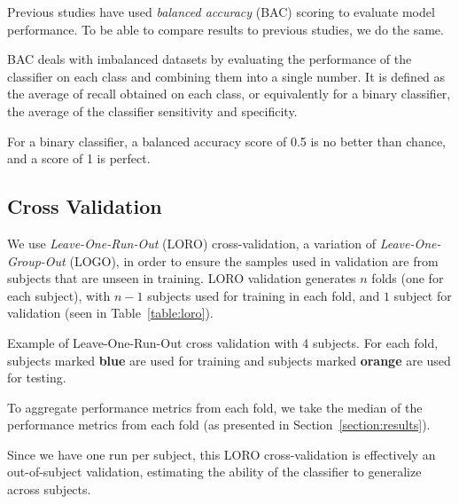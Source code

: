         Previous studies have used \emph{balanced accuracy} (BAC) scoring to evaluate model performance. To be able to compare results to previous studies, we do the same. 

        BAC deals with imbalanced datasets by evaluating the performance of the classifier on each class and combining them into a single number. It is defined as the average of recall obtained on each class, or equivalently for a binary classifier, the average of the classifier sensitivity and specificity. 

        For a binary classifier, a balanced accuracy score of 0.5 is no better than chance, and a score of 1 is perfect.

    \subsection{Cross Validation}

        We use \emph{Leave-One-Run-Out} (LORO) cross-validation, a variation of \emph{Leave-One-Group-Out} (LOGO), in order to ensure the samples used in validation are from subjects that are unseen in training. LORO validation generates $n$ folds (one for each subject), with $n-1$ subjects used for training in each fold, and $1$ subject for validation (seen in Table~\ref{table:loro}).

        \begin{table}[h]
            \centering
            
            \caption{Example of Leave-One-Run-Out cross validation with 4 subjects. For each fold, subjects marked \textcolor{NavyBlue}{\textbf{blue}} are used for training and subjects marked \textcolor{BurntOrange}{\textbf{orange}} are used for testing.}\label{table:loro}
        \end{table}

        To aggregate performance metrics from each fold, we take the median of the performance metrics from each fold (as presented in Section~\ref{section:results}).

        Since we have one run per subject, this LORO cross-validation is effectively an out-of-subject validation, estimating the ability of the classifier to generalize across subjects.

